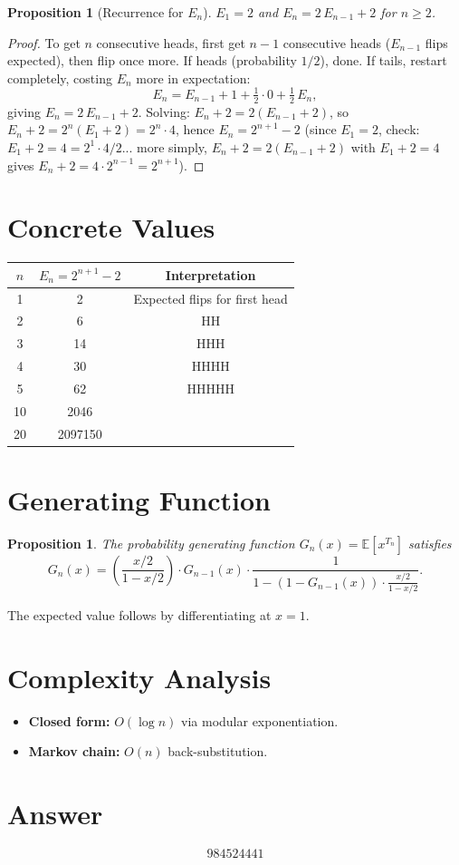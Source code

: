 \documentclass[11pt]{article}
\newtheorem{proposition}[theorem]{Proposition}
\begin{document}
\begin{proposition}[Recurrence for $E_n$]
$E_1 = 2$ and $E_n = 2\,E_{n-1} + 2$ for $n \ge 2$.
\end{proposition}

\begin{proof}
To get $n$ consecutive heads, first get $n-1$ consecutive heads ($E_{n-1}$ flips expected), then flip once more. If heads (probability $1/2$), done. If tails, restart completely, costing $E_n$ more in expectation:
\[
E_n = E_{n-1} + 1 + \tfrac{1}{2} \cdot 0 + \tfrac{1}{2}\,E_n,
\]
giving $E_n = 2\,E_{n-1} + 2$. Solving: $E_n + 2 = 2(E_{n-1} + 2)$, so $E_n + 2 = 2^n(E_1 + 2) = 2^n \cdot 4$, hence $E_n = 2^{n+1} - 2$ (since $E_1 = 2$, check: $E_1 + 2 = 4 = 2^1 \cdot 4 / 2$... more simply, $E_n + 2 = 2(E_{n-1}+2)$ with $E_1+2=4$ gives $E_n+2 = 4 \cdot 2^{n-1} = 2^{n+1}$).
\end{proof}

\section{Concrete Values}

\begin{center}
\begin{tabular}{ccc}
\toprule
$n$ & $E_n = 2^{n+1}-2$ & Interpretation \\
\midrule
1  & 2     & Expected flips for first head \\
2  & 6     & HH \\
3  & 14    & HHH \\
4  & 30    & HHHH \\
5  & 62    & HHHHH \\
10 & 2046  & \\
20 & 2097150 & \\
\bottomrule
\end{tabular}
\end{center}

\section{Generating Function}

\begin{proposition}
The probability generating function $G_n(x) = \mathbb{E}[x^{T_n}]$ satisfies
\[
G_n(x) = \left(\frac{x/2}{1 - x/2}\right) \cdot G_{n-1}(x) \cdot \frac{1}{1 - (1-G_{n-1}(x))\cdot\frac{x/2}{1-x/2}}.
\]
\end{proposition}

The expected value follows by differentiating at $x=1$.

\section{Complexity Analysis}

\begin{itemize}
\item \textbf{Closed form:} $O(\log n)$ via modular exponentiation.
\item \textbf{Markov chain:} $O(n)$ back-substitution.
\end{itemize}

\section{Answer}

\[
\boxed{984524441}
\]
\end{document}
